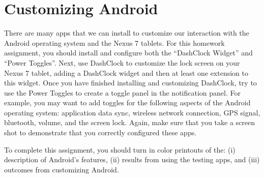 \section*{Customizing Android}

There are many apps that we can install to customize our interaction with the Android operating system and the Nexus 7
tablets.  For this homework assignment, you should install and configure both the ``DashClock Widget'' and ``Power Toggles''.
Next, use DashClock to customize the lock screen on your Nexus 7 tablet, adding a DashClock widget and then at least one extension
to this widget.  Once you have finished installing and customizing DashClock, try to use the Power Toggles to create a
toggle panel in the notification panel.  For example, you may want to add toggles for the following aspects of the
Android operating system: application data sync, wireless network connection, GPS signal, bluetooth, volume, and the
screen lock.  Again, make sure that you take a screen shot to demonstrate that you correctly configured these apps.

To complete this assignment, you should turn in color printouts of the: (i) description of Android's features, (ii)
results from using the testing apps, and (iii) outcomes from customizing Android.

% 
% 
% 	
% 
% 
% 


